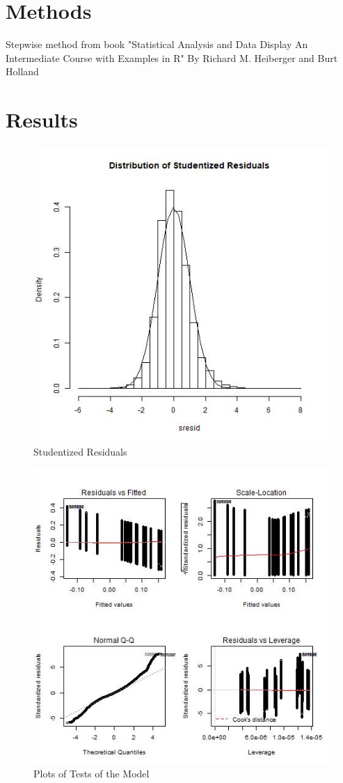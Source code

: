 \documentclass{article}
\begin{document}
\section{Methods}

Stepwise method from book "Statistical Analysis and Data Display An Intermediate Course with Examples in R" By Richard M. Heiberger and Burt Holland 



\section{Results}




\begin{figure}[H]
    \centering
    \includegraphics[width= .6\linewidth]{images/student_resid_plot.jpeg}
    \caption{Studentized Residuals}
    \label{fig: student_resid}
\end{figure}

\begin{figure}[H]
    \centering
    \includegraphics[width= .8\linewidth]{images/plot_matrix.jpeg}
    \caption{Plots of Tests of the Model}
    \label{fig: plot_matrix}
\end{figure}
\end{document}
